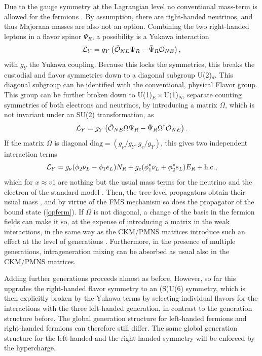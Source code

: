 \documentclass[final,twoside,12pt]{article}
\newcommand*{\La}{{\cal{L}}}
\newcommand*{\no}{\noindent}
\newcommand*{\be}{\begin{equation}}
\newcommand*{\ee}{\end{equation}}
\newcommand*{\pref}[1]{(\ref{#1})}
\newcommand*{\nn}{\nonumber}
\newcommand*{\diag}{\mathrm{diag}}
\newcommand*{\1}{1\!\!\!\bot}
\newcommand*{\op}{{\cal O}}
\begin{document}
Due to the gauge symmetry at the Lagrangian level no conventional mass-term is allowed for the fermions \cite{Bohm:2001yx}. By assumption, there are right-handed neutrinos, and thus Majorana masses are also not an option. Combining the two right-handed leptons in a flavor spinor $\Psi_R$, a possibility is a Yukawa interaction
\be
\La_Y=g_Y\left(\bar{\op}_{NE}\Psi_R-\bar{\Psi}_R\op_{NE}\right)\nn,
\ee
\no with $g_Y$ the Yukawa coupling. Because this locks the symmetries, this breaks the custodial and flavor symmetries down to a diagonal subgroup U(2)$_d$. This diagonal subgroup can be identified with the  conventional, physical Flavor group. This group can be further broken down to U(1)$_E\times$U(1)$_N$, separate counting symmetries of both electrons and neutrinos, by introducing a matrix $\Omega$, which is not invariant under an SU(2) transformation, as
\be
\La_Y=g_Y\left(\bar{\op}_{NE}\Omega\Psi_R-\bar{\Psi}_R\Omega^\dagger\op_{NE}\right)\label{yukawa}.
\ee
\no If the matrix $\Omega$ is diagonal $\diag=(g_\nu/g_Y,g_e/g_Y)$, this gives two independent interaction terms
\be
\La_Y=g_\nu(\phi_2\bar{\nu}_L-\phi_1 \bar{e}_L)N_R+g_e(\phi_1^*\bar{\nu}_L+\phi_2^*e_L)E_R+\text{h.c.}\nn,
\ee
\no which for $x\approx v1$ are nothing but the usual mass terms for the neutrino and the electron of the standard model \cite{Bohm:2001yx}. Then, the tree-level propagators obtain their usual mass \cite{Bohm:2001yx}, and by virtue of the FMS mechanism so does the propagator of the bound state \pref{opferm}. If $\Omega$ is not diagonal, a change of the basis in the fermion fields can make it so, at the expense of introducing a matrix in the weak interactions, in the same way as the CKM/PMNS matrices introduce such an effect at the level of generations \cite{Bohm:2001yx}. Furthermore, in the presence of multiple generations, intrageneration mixing can be absorbed as usual also in the CKM/PMNS matrices.

Adding further generations proceeds almost as before. However, so far this upgrades the right-handed flavor symmetry to an (S)U(6) symmetry, which is then explicitly broken by the Yukawa terms by selecting individual flavors for the interactions with the three left-handed generation, in contrast to the generation structure before. The global generation structure for left-handed fermions and right-handed fermions can therefore still differ. The same global generation structure for the left-handed and the right-handed symmetry will be enforced by the hypercharge.
\end{document}
